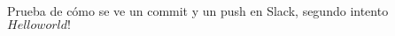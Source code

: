 \documentclass[12pt]{article}
\begin{document}
Prueba de cómo se ve un commit y un push en Slack, segundo intento
$Hello world!$ %
\end{document}

